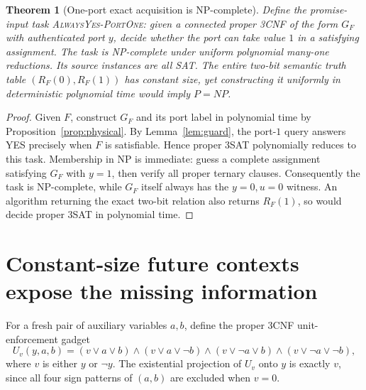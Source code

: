\documentclass[11pt]{article}
\newtheorem{theorem}{Theorem}
\begin{document}
\begin{theorem}[One-port exact acquisition is NP-complete]\label{thm:npcomplete}
Define the promise-input task \textsc{AlwaysYes-PortOne}: given a connected proper 3CNF of the form $G_F$ with authenticated port $y$, decide whether the port can take value $1$ in a satisfying assignment. The task is NP-complete under uniform polynomial many-one reductions. Its source instances are \emph{all SAT}. The entire two-bit semantic truth table $(R_F(0),R_F(1))$ has constant size, yet constructing it uniformly in deterministic polynomial time would imply $P=NP$.
\end{theorem}
\begin{proof}
Given $F$, construct $G_F$ and its port label in polynomial time by Proposition~\ref{prop:physical}. By Lemma~\ref{lem:guard}, the port-$1$ query answers YES precisely when $F$ is satisfiable. Hence proper 3SAT polynomially reduces to this task. Membership in NP is immediate: guess a complete assignment satisfying $G_F$ with $y=1$, then verify all proper ternary clauses. Consequently the task is NP-complete, while $G_F$ itself always has the $y=0,u=0$ witness. An algorithm returning the exact two-bit relation also returns $R_F(1)$, so would decide proper 3SAT in polynomial time.
\end{proof}

\section{Constant-size future contexts expose the missing information}
For a fresh pair of auxiliary variables $a,b$, define the proper 3CNF unit-enforcement gadget
\begin{equation}\label{eq:unit}
 U_v(y,a,b)=
 (v\vee a\vee b)\wedge(v\vee a\vee\neg b)\wedge
 (v\vee\neg a\vee b)\wedge(v\vee\neg a\vee\neg b),
\end{equation}
where $v$ is either $y$ or $\neg y$. The existential projection of $U_v$ onto $y$ is exactly $v$, since all four sign patterns of $(a,b)$ are excluded when $v=0$.
\end{document}

